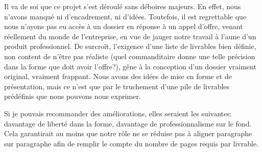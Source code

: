 Il va de soi que ce projet s'est déroulé sans déboires majeurs.  En effet, nous
n'avons manqué ni d'encadrement, ni d'idées.  Toutefois, il est regrettable que
nous n'ayons pas eu accès à un dossier en réponse à un appel d'offre, venant
réellement du monde de l'entreprise, en vue de jauger notre travail à l'aune
d'un produit professionnel.  De surcroît, l'exigence d'une liste de livrables
bien définie, non content de n'être pas réaliste (quel commanditaire donne une
telle précision dans la forme que doit avoir l'offre?), gêne à la conception
d'un dossier vraiment original, vraiment frappant.  Nous avons des idées de mise
en forme et de présentation, mais ce n'est que par le truchement d'une pile de
livrables prédéfinis que nous pouvons nous exprimer.

Si je pouvais recommander des améliorations, elles seraient les suivantes:
davantage de liberté dans la forme, davantage de professionnalisme sur le fond.
Cela garantirait au moins que notre rôle ne se réduise pas à aligner paragraphe
sur paragraphe afin de remplir le compte du nombre de pages requis par livrable.
